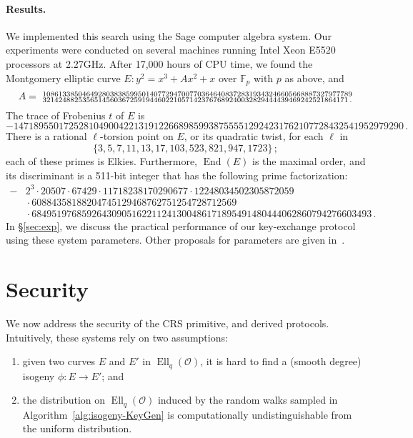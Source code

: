 \documentclass{llncs}
\newcommand{\F}{\mathbb{F}}
\renewcommand{\O}{\mathcal{O}}
\DeclareMathOperator{\End}{End}
\DeclareMathOperator{\Ell}{Ell}
\begin{document}
\paragraph{Results.}
We implemented this search using the Sage computer algebra system.
Our experiments were conducted on several machines running
Intel Xeon E5520 processors at 2.27GHz.
After 17,000 hours of CPU time, we found the Montgomery elliptic curve 
$
	E : y^2 = x^3 + A x^2 + x
$
over $\F_p$ with $p$ as above, and
\[
  A =\
  \begin{subarray}{l}
    108613385046492803838599501407729470077036464083728319343246605668887327977789 \\
    32142488253565145603672591944602210571423767689240032829444439469242521864171\,.
  \end{subarray}
\]
The trace of Frobenius $t$ of $E$ is
\[
    \scriptstyle -147189550172528104900422131912266898599387555512924231762107728432541952979290\,.
\]
There is a rational $\ell$-torsion point 
on $E$, or its quadratic twist, for each $\ell$ in
\[
  \{3, 5, 7, 11, 13, 17, 103, 523, 821, 947, 1723\}
  \,;
\]
each of these primes is Elkies.
Furthermore, $\End(E)$ is the maximal order, and its discriminant is
a 511-bit integer that has the following prime factorization:
\[
\begin{aligned}
    \scriptstyle -
    & \scriptstyle 2^3 \cdot 20507 \cdot 67429 \cdot 11718238170290677 \cdot 12248034502305872059 \\
    & \scriptstyle {}\cdot 60884358188204745129468762751254728712569\\
    & \scriptstyle {}\cdot 68495197685926430905162211241300486171895491480444062860794276603493\,.
\end{aligned}
\]
In \S\ref{sec:exp}, we discuss the practical performance
of our key-exchange protocol using these system parameters.
Other proposals for parameters are given in~\cite{memoire}.

\section{Security}
\label{sec:sec}

We now address the security of the CRS primitive, and derived
protocols. Intuitively, these systems rely on two assumptions:
\begin{enumerate}
    \item given two curves $E$ and $E'$ in $\Ell_q(\O)$, it is hard to
        find a (smooth degree) isogeny $ϕ:E→E'$; and
    \item the distribution on $\Ell_q(\O)$ induced by the random walks
        sampled in Algorithm~\ref{alg:isogeny-KeyGen} is computationally
        undistinguishable from the uniform distribution.
\end{enumerate}
\end{document}
